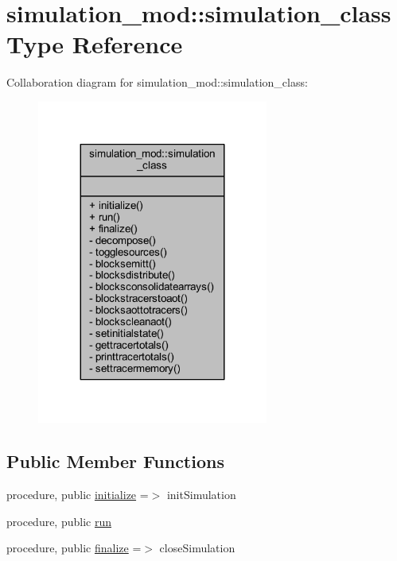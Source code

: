 \hypertarget{structsimulation__mod_1_1simulation__class}{}\section{simulation\+\_\+mod\+:\+:simulation\+\_\+class Type Reference}
\label{structsimulation__mod_1_1simulation__class}


Collaboration diagram for simulation\+\_\+mod\+:\+:simulation\+\_\+class\+:\nopagebreak
\begin{figure}[H]
\begin{center}
\leavevmode
\includegraphics[width=215pt]{structsimulation__mod_1_1simulation__class__coll__graph}
\end{center}
\end{figure}
\subsection*{Public Member Functions}
\begin{DoxyCompactItemize}
\item 
procedure, public \mbox{\hyperlink{structsimulation__mod_1_1simulation__class_aa66177f314198046f3e05d9a0a322a22}{initialize}} =$>$ init\+Simulation
\item 
procedure, public \mbox{\hyperlink{structsimulation__mod_1_1simulation__class_a47c2f9dd8a012a523ac88aa8d3c6a911}{run}}
\item 
procedure, public \mbox{\hyperlink{structsimulation__mod_1_1simulation__class_a6cc0559141483bce4e4f19ef730735df}{finalize}} =$>$ close\+Simulation
\end{DoxyCompactItemize}
